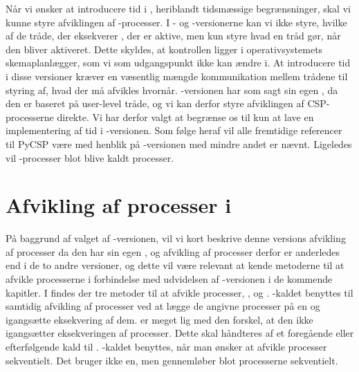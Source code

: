 Når vi ønsker at introducere tid i \pycsp, heriblandt tidsmæssige begrænsninger, skal vi kunne styre afviklingen af \csp-processer. I  - og -versionerne kan vi ikke styre, hvilke af de tråde, der eksekverer \csp, der er aktive, men kun styre hvad en tråd gør, når den bliver aktiveret. Dette skyldes, at kontrollen ligger i operativsystemets skemaplanlægger, som vi som udgangspunkt ikke kan ændre i. At introducere tid i disse versioner kræver en væsentlig mængde kommunikation mellem trådene til styring af, hvad der må afvikles hvornår. -versionen har som sagt sin egen \sched, da den er baseret på user-level tråde, og vi kan derfor styre afviklingen af CSP-processerne direkte. Vi har derfor valgt at begrænse os til kun at lave en implementering af tid i -versionen. Som følge heraf vil alle fremtidige referencer til PyCSP være med henblik på -versionen med mindre andet er nævnt. Ligeledes vil \csp-processer  blot blive  kaldt  processer. 

\section{Afvikling af processer i }
På baggrund af valget af -versionen, vil vi kort beskrive denne versions afvikling af processer da den har sin egen \sched, og afvikling af processer derfor er anderledes end i de to andre versioner, og dette vil være relevant at kende metoderne til at afvikle processerne i forbindelse med udvidelsen af -versionen i de kommende kapitler.
I \pycsp findes der tre metoder til at afvikle processer, ,  og . 
-kaldet benyttes til samtidig afvikling af processer ved at lægge de angivne processer på \sched en og igangsætte eksekvering af dem. 
 er meget lig  med den forskel, at den ikke igangsætter eksekveringen af processer. Dette skal håndteres af et foregående eller efterfølgende kald til .
-kaldet benyttes, når man ønsker at afvikle processer sekventielt. Det bruger ikke \sched en, men gennemløber blot processerne sekventielt.



